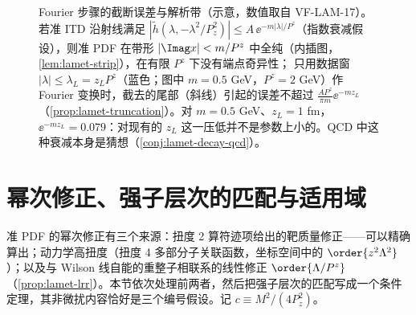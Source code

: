 \begin{figure}[htbp]
\caption{Fourier 步骤的截断误差与解析带（示意，数值取自 VF-LAM-17）。若准 ITD 沿射线满足 $|\tilde h(\lambda,-\lambda^2/P_z^2)|\le A\,\ee^{-m|\lambda|/P^z}$（指数衰减假设），则准 PDF 在带形 $|\Imag x|<m/P^z$ 中全纯（内插图，\cref{lem:lamet-strip}），在有限 $P^z$ 下没有端点奇异性；
只用数据窗 $|\lambda|\le\lambda_L=z_LP^z$（蓝色；图中 $m=0.5$ GeV，$P^z=2$ GeV）作 Fourier 变换时，截去的尾部（斜线）引起的误差不超过 $\frac{AP^z}{\pi m}\ee^{-mz_L}$（\cref{prop:lamet-truncation}）。对 $m=0.5$ GeV、$z_L=1$ fm，$\ee^{-mz_L}=0.079$：对现有的 $z_L$ 这一压低并不是参数上小的。QCD 中这种衰减本身是猜想（\cref{conj:lamet-decay-qcd}）。}
\label{fig:lamet-fourier}
\end{figure}

\section{幂次修正、强子层次的匹配与适用域}\label{sec:lamet-power}

准 PDF 的幂次修正有三个来源：扭度 2 算符迹项给出的靶质量修正——可以精确算出；动力学高扭度（扭度 4 多部分子关联函数，坐标空间中的 $\order{z^2\Lambda^2}$）；以及与 Wilson 线自能的重整子相联系的线性修正 $\order{\Lambda/P^z}$（\cref{prop:lamet-lrr}）。本节依次处理前两者，然后把强子层次的匹配写成一个条件定理，其非微扰内容恰好是三个编号假设。记 $c\equiv M^2/(4P_z^2)$。

